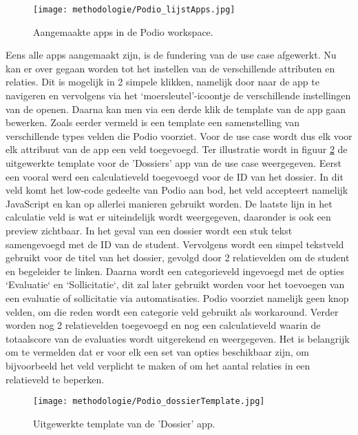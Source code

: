 \begin{figure}[ht]
    \centering
    \texttt{[image: methodologie/Podio\_lijstApps.jpg]}
    \caption{Aangemaakte apps in de Podio workspace.}
    \label{fig:meth_podio_lijstApps}
\end{figure}

Eens alle apps aangemaakt zijn, is de fundering van de use case afgewerkt. Nu kan er over gegaan worden tot het instellen van de verschillende attributen en relaties. Dit is mogelijk in 2 simpele klikken, namelijk door naar de app te navigeren en vervolgens via het ‘moersleutel’-icoontje de verschillende instellingen van de openen. Daarna kan men via een derde klik de template van de app gaan bewerken. Zoals eerder vermeld is een template een samenstelling van verschillende types velden die Podio voorziet. Voor de use case wordt dus elk voor elk attribuut van de app een veld toegevoegd. Ter illustratie wordt in figuur \ref{fig:meth_podio_dossierTemplate} de uitgewerkte template voor de 'Dossiers' app van de use case weergegeven. Eerst een vooral werd een calculatieveld toegevoegd voor de ID van het dossier. In dit veld komt het low-code gedeelte van Podio aan bod, het veld accepteert namelijk JavaScript en kan op allerlei manieren gebruikt worden. De laatste lijn in het calculatie veld is wat er uiteindelijk wordt weergegeven, daaronder is ook een preview zichtbaar. In het geval van een dossier wordt een stuk tekst samengevoegd met de ID van de student. Vervolgens wordt een simpel tekstveld gebruikt voor de titel van het dossier, gevolgd door 2 relatievelden om de student en begeleider te linken. Daarna wordt een categorieveld ingevoegd met de opties `Evaluatie` en `Sollicitatie`, dit zal later gebruikt worden voor het toevoegen van een evaluatie of sollicitatie via automatisaties. Podio voorziet namelijk geen knop velden, om die reden wordt een categorie veld gebruikt als workaround. Verder worden nog 2 relatievelden toegevoegd en nog een calculatieveld waarin de totaalscore van de evaluaties wordt uitgerekend en weergegeven. Het is belangrijk om te vermelden dat er voor elk een set van opties beschikbaar zijn, om bijvoorbeeld het veld verplicht te maken of om het aantal relaties in een relatieveld te beperken. \\

\begin{figure}[h]
    \centering
    \texttt{[image: methodologie/Podio\_dossierTemplate.jpg]}
    \caption{Uitgewerkte template van de 'Dossier' app.}
    \label{fig:meth_podio_dossierTemplate}
\end{figure}

